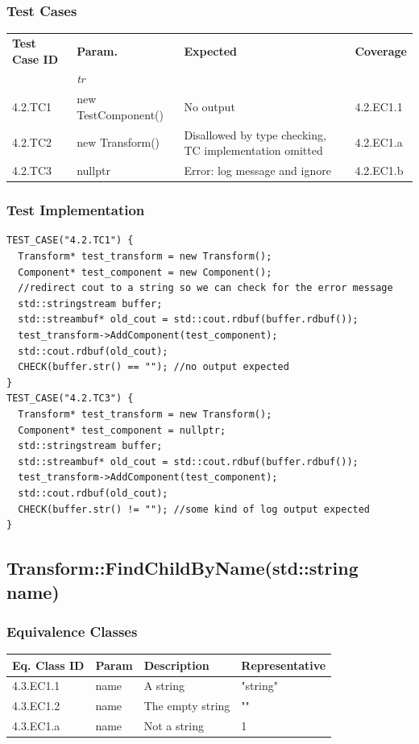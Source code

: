 \documentclass[11pt]{article}
\begin{document}
\subsubsection*{Test Cases}
\label{sec:orgfcd335d}
\begin{center}
\begin{tabularx}{\textwidth}{lXXX}
\hline
\textbf{Test Case ID} & \textbf{Param.} & \textbf{Expected} & \textbf{Coverage}\\
 & \textit{tr} &  & \\
\hline
4.2.TC1 & new TestComponent() & No output & 4.2.EC1.1\\
\hline
4.2.TC2 & new Transform() & Disallowed by type checking, TC implementation omitted & 4.2.EC1.a\\
\hline
4.2.TC3 & nullptr & Error: log message and ignore & 4.2.EC1.b\\
\hline
\end{tabularx}
\end{center}
\subsubsection*{Test Implementation}
\label{sec:orgab94cc7}
\begin{verbatim}
TEST_CASE("4.2.TC1") {
  Transform* test_transform = new Transform();
  Component* test_component = new Component();
  //redirect cout to a string so we can check for the error message
  std::stringstream buffer;
  std::streambuf* old_cout = std::cout.rdbuf(buffer.rdbuf());
  test_transform->AddComponent(test_component);
  std::cout.rdbuf(old_cout);
  CHECK(buffer.str() == ""); //no output expected
}
TEST_CASE("4.2.TC3") {
  Transform* test_transform = new Transform();
  Component* test_component = nullptr;
  std::stringstream buffer;
  std::streambuf* old_cout = std::cout.rdbuf(buffer.rdbuf());
  test_transform->AddComponent(test_component);
  std::cout.rdbuf(old_cout);
  CHECK(buffer.str() != ""); //some kind of log output expected
}
\end{verbatim}

\clearpage
\subsection{Transform::FindChildByName(std::string name)}
\label{sec:org3e41296}
\subsubsection*{Equivalence Classes}
\label{sec:orgaeb3fb6}
\begin{center}
\begin{tabularx}{\textwidth}{lXXX}
\hline
\textbf{Eq. Class ID} & \textbf{Param} & \textbf{Description} & \textbf{Representative}\\
\hline
4.3.EC1.1 & name & A string & "string"\\
\hline
4.3.EC1.2 & name & The empty string & ""\\
\hline
4.3.EC1.a & name & Not a string & 1\\
\hline
\end{tabularx}
\end{center}
\end{document}
